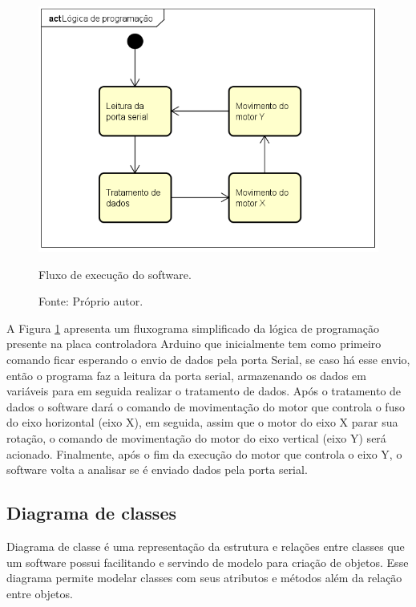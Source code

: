 \begin{figure}[H]
\centering
\includegraphics[width = 1\linewidth]{figuras/fluxoexecucao}
\caption{Fluxo de execução do software.}
\caption*{Fonte: Próprio autor.}
\label{fig:fluxoexecucao}
\end{figure}
    
A Figura \ref{fig:fluxoexecucao} apresenta um fluxograma simplificado da lógica de programação presente 
na placa controladora Arduino que inicialmente tem como primeiro comando ficar esperando o envio de 
dados pela porta Serial, se caso há esse envio, então o programa faz a leitura da porta serial, 
armazenando os dados em variáveis para em seguida realizar o tratamento de dados. Após o tratamento 
de dados o software dará o comando de movimentação do motor que controla o fuso do eixo horizontal 
(eixo X), em seguida, assim que o motor do eixo X parar sua rotação, o comando de movimentação 
do motor do eixo vertical (eixo Y) será acionado. Finalmente, após o fim da execução do motor 
que controla o eixo Y, o software volta a analisar se é enviado dados pela porta serial.

\subsection{Diagrama de classes}\label{subsec:metdiagrama}

Diagrama de classe é uma representação da estrutura e relações entre classes que um software possui 
facilitando e servindo de modelo para criação de objetos. Esse diagrama permite modelar classes com seus 
atributos e métodos além da relação entre objetos.

